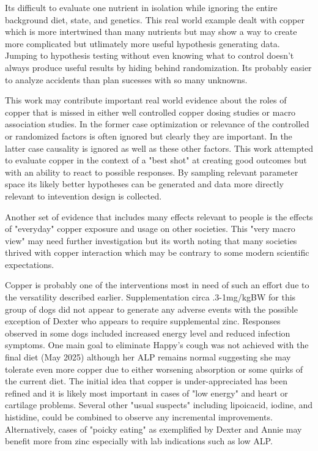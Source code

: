 Its difficult to evaluate one nutrient in isolation while ignoring
the entire background diet, state, and genetics. This real world
example dealt with copper which is more intertwined than
many nutrients but may show a way to create more complicated but
utlimately more useful hypothesis generating data. Jumping to
hypothesis testing without even knowing what to control 
doesn't always produce useful results by hiding behind randomization.
Its probably easier to analyze accidents than plan sucesses
with so many unknowns. 




This work may contribute important real world evidence
about the roles of copper that is missed in either well controlled
copper dosing studies or macro association studies. In the former
case optimization or relevance of the controlled or randomized
factors is often ignored but clearly they are important. In the
latter case causality is ignored as well as these other factors.
This work attempted to evaluate copper in the context of a "best
shot" at creating good outcomes but with an ability to react to
possible responses. By sampling relevant parameter space its likely
better hypotheses can be generated and data more directly relevant
to intevention design is collected. 


Another set of evidence that includes many effects relevant
to people is the effects of "everyday" copper exposure and usage on
other societies.  This "very macro view" may need further investigation
but its worth noting that many societies thrived with copper
interaction which may be contrary to some modern scientific expectations.



Copper is probably one of the interventions most in need of such an effort
due to the versatility described earlier. 
Supplementation circa .3-1mg/kgBW for this group of dogs
did not appear to generate any adverse events with the possible
exception of Dexter who appears to require supplemental zinc. 
Responses observed in some dogs included increased energy level and  reduced 
infection symptoms.
One main goal to eliminate Happy's
cough was not achieved with the final diet (May 2025)  although her ALP
remains normal suggesting she may tolerate  even more copper
due to either worsening absorption or some quirks of the current diet.
The initial idea that copper is under-appreciated has been 
refined and it is likely most important in cases of "low energy"
and heart or cartilage problems. 
Several other "usual suspects" including lipoicacid, iodine,
and histidine,  could be combined to observe any incremental improvements. 
Alternatively, cases of
"poicky eating" as exemplified by Dexter and Annie may benefit
more from zinc especially with lab indications such as low ALP. 

